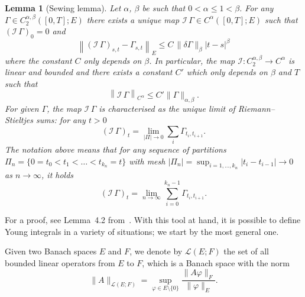\documentclass[10pt]{article}
\newtheorem{lemma}[theorem]{Lemma}
\begin{document}
\begin{lemma}[Sewing lemma]
  \label{appendixA1 sewing lemma}Let $\alpha$, $\beta$ be such that $0 <
  \alpha \leqslant 1 < \beta$. For any $\Gamma \in C^{\alpha, \beta}_2 ([0, T]
  ; E)$ there exists a unique map $\mathcal{I} \, \Gamma \in C^{\alpha} ([0,
  T] ; E)$ such that $\left( \mathcal{I} \, \Gamma \right)_0 = 0$ and
  \begin{equation}
    \left\| \left( \mathcal{I} \, \Gamma \right)_{s, t} - \Gamma_{s, t}
    \right\|_E \leqslant C \, \| \delta \Gamma \|_{\beta}  | t - s |^{\beta}
    \label{appendixA1 sewing property 1}
  \end{equation}
  where the constant $C$ only depends on $\beta$. In particular, the map
  $\mathcal{I} : C^{\alpha, \beta}_2 \rightarrow C^{\alpha}$ is linear and
  bounded and there exists a constant $C'$ which only depends on $\beta$ and
  $T$ such that
  \begin{equation}
    \left\| \mathcal{I} \, \Gamma \right\|_{C^{\alpha}} \leqslant C'  \|
    \Gamma \|_{\alpha, \beta} . \label{appendixA1 sewing property 2}
  \end{equation}
  For given $\Gamma$, the map $\mathcal{I} \, \Gamma$ is characterised as the
  unique limit of Riemann--Stieltjes sums: for any $t > 0$
  \[ \left( \mathcal{I} \, \Gamma \right)_t = \lim_{| \Pi | \rightarrow 0}
     \sum_i \Gamma_{t_i, t_{i + 1}} . \]
  The notation above means that for any sequence of partitions $\Pi_n = \{ 0 =
  t_0 < t_1 < \ldots < t_{k_n} = t \}$ with mesh $| \Pi_n | = \sup_{i = 1,
  \ldots, k_n} | t_i - t_{i - 1} | \rightarrow 0$ as $n \rightarrow \infty$,
  it holds
  \[ \left( \mathcal{I} \, \Gamma \right)_t = \lim_{n \rightarrow \infty}
     \sum_{i = 0}^{k_n - 1} \Gamma_{t_i, t_{i + 1}} . \]
\end{lemma}

For a proof, see Lemma~4.2 from~{\cite{frizhairer}}. With this tool at hand,
it is possible to define Young integrals in a variety of situations; we start
by the most general one.

Given two Banach spaces $E$ and $F$, we denote by $\mathcal{L} (E ; F)$ the
set of all bounded linear operators from $E$ to $F$, which is a Banach space
with the norm
\[ \| A \|_{\mathcal{L} (E ; F)} = \sup_{\varphi \in E \setminus \{ 0 \}}
   \frac{\| A \varphi \|_F}{\| \varphi \|_E} . \]
\end{document}
